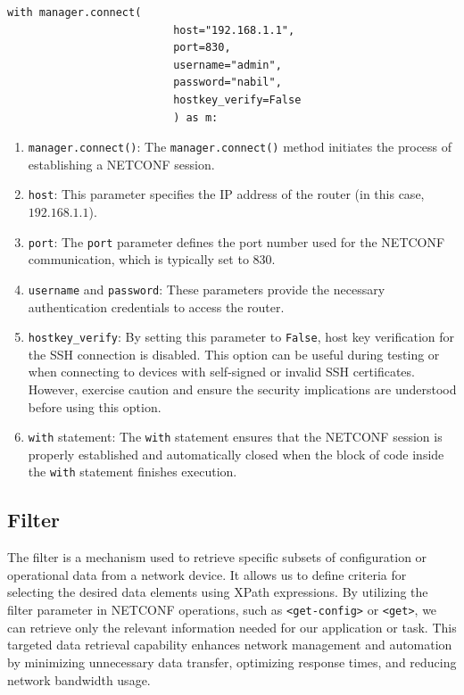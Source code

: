 \begin{lstlisting}[style=pythonStyle, caption={Session establishment \cite{github}.}, backgroundcolor=\color{codebackground}]
                    with manager.connect(
                          host="192.168.1.1",
                          port=830,
                          username="admin", 
                          password="nabil",
                          hostkey_verify=False
                          ) as m:           
\end{lstlisting}


\begin{enumerate}
    \item \texttt{manager.connect()}: The \texttt{manager.connect()} method initiates the process of establishing a NETCONF session.
    \item \texttt{host}: This parameter specifies the IP address of the router (in this case, $192.168.1.1$).
    \item \texttt{port}: The \texttt{port} parameter defines the port number used for the NETCONF communication, which is typically set to 830.
    \item \texttt{username} and \texttt{password}: These parameters provide the necessary authentication credentials to access the router.
    \item \texttt{hostkey\_verify}: By setting this parameter to \texttt{False}, host key verification for the SSH connection is disabled. This option can be useful during testing or when connecting to devices with self-signed or invalid SSH certificates. However, exercise caution and ensure the security implications are understood before using this option.
    \item \texttt{with} statement: The \texttt{with} statement ensures that the NETCONF session is properly established and automatically closed when the block of code inside the \texttt{with} statement finishes execution.
\end{enumerate}
\subsection{Filter}
The filter is a mechanism used to retrieve specific subsets of configuration or operational data from a network device. It allows us to define criteria for selecting the desired data elements using XPath expressions. By utilizing the filter parameter in NETCONF operations, such as \texttt{<get-config>} or \texttt{<get>}, we can retrieve only the relevant information needed for our application or task. This targeted data retrieval capability enhances network management and automation by minimizing unnecessary data transfer, optimizing response times, and reducing network bandwidth usage. 

